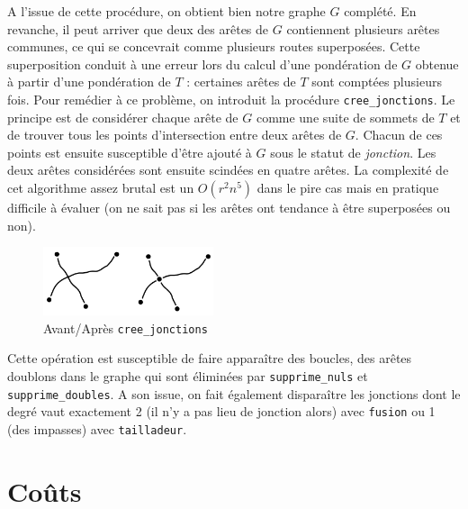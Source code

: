 \documentclass[french]{article}
\begin{document}
		A l'issue de cette procédure, on obtient bien notre graphe $G$ complété. En revanche, il peut arriver que deux des arêtes de $G$ contiennent plusieurs arêtes communes, ce qui se concevrait comme plusieurs routes superposées. Cette superposition conduit à une erreur lors du calcul d'une pondération de $G$ obtenue à partir d'une pondération de $T$ : certaines arêtes de $T$ sont comptées plusieurs fois. Pour remédier à ce problème, on introduit la procédure \verb?cree_jonctions?.\newline
		Le principe est de considérer chaque arête de $G$ comme une suite de sommets de $T$ et de trouver tous les points d'intersection entre deux arêtes de $G$. Chacun de ces points est ensuite susceptible d'être ajouté à $G$ sous le statut de \emph{jonction}. Les deux arêtes considérées sont ensuite scindées en quatre arêtes. La complexité de cet algorithme assez brutal est un $O(r^{2}n^{5})$ dans le pire cas mais en pratique difficile à évaluer (on ne sait pas si les arêtes ont tendance à être superposées ou non).

		\begin{figure}[h]
			\centering
			\includegraphics[width=5cm]{Pics/jonct.jpg}
			\caption{Avant/Après \verb?cree_jonctions?}
		\end{figure}

		Cette opération est susceptible de faire apparaître des boucles, des arêtes doublons dans le graphe qui sont éliminées par \verb?supprime_nuls? et \verb?supprime_doubles?. A son issue, on fait également disparaître les jonctions dont le degré vaut exactement 2 (il n'y a pas lieu de jonction alors) avec \verb?fusion? ou 1 (des impasses) avec \verb?tailladeur?.


		\section{Coûts}
\end{document}
